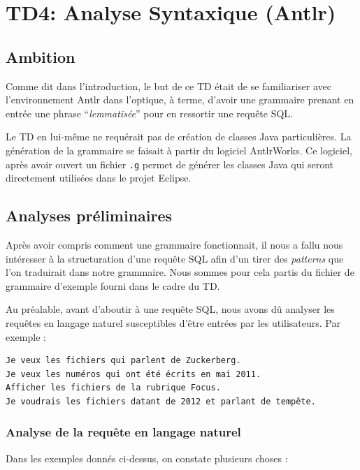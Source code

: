 \chapter{TD4: Analyse Syntaxique (Antlr)}

\section{Ambition}

Comme dit dans l'introduction, le but de ce TD était de se familiariser avec l'environnement Antlr dans l'optique, à terme, d'avoir une grammaire prenant en entrée une phrase ``\textit{lemmatisée}'' pour en ressortir une requête SQL.

\medskip

Le TD en lui-même ne requérait pas de création de classes Java particulières. La génération de la grammaire se faisait à partir du logiciel AntlrWorks. Ce logiciel, après avoir ouvert un fichier \lstinline{.g} permet de générer les classes Java qui seront directement utilisées dans le projet Eclipse.

\section{Analyses préliminaires}

Après avoir compris comment une grammaire fonctionnait, il nous a fallu nous intéresser à la structuration d'une requête SQL afin d'un tirer des \textit{patterns} que l'on traduirait dans notre grammaire. Nous sommes pour cela partis du fichier de grammaire d'exemple fourni dans le cadre du TD.

\medskip

Au préalable, avant d'aboutir à une requête SQL, nous avons dû analyser les requêtes en langage naturel susceptibles d'être entrées par les utilisateurs. Par exemple :

\fakeshell
\begin{lstlisting}
Je veux les fichiers qui parlent de Zuckerberg.
Je veux les numéros qui ont été écrits en mai 2011.
Afficher les fichiers de la rubrique Focus.
Je voudrais les fichiers datant de 2012 et parlant de tempête.
\end{lstlisting}
\java

\subsection{Analyse de la requête en langage naturel}

Dans les exemples donnés ci-dessus, on constate plusieurs choses :

